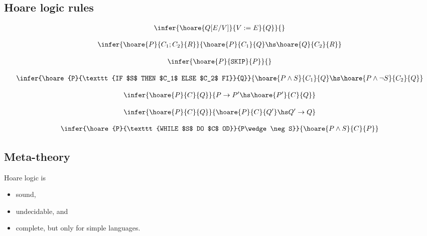 \documentclass{article}
\begin{document}
\subsection{Hoare logic rules}

\begin{definition}
	\begin{align*}
		\infer{\hoare{Q[E/V]}{V:=E}{Q}}{}
	\end{align*}
\end{definition}

\begin{definition}
	\begin{align*}
		\infer{\hoare{P}{C_1; C_2}{R}}{\hoare{P}{C_1}{Q} \hs \hoare{Q}{C_2}{R}}
	\end{align*}
\end{definition}

\begin{definition}
	\begin{align*}
		\infer{\hoare{P}{\texttt{SKIP}}{P}}{}
	\end{align*}
\end{definition}

\begin{definition}
	\begin{align*}
		\infer{\hoare{P}{\texttt{IF $S$ THEN $C_1$ ELSE $C_2$ FI}}{Q}}{
			\hoare{P\wedge S}{C_1}{Q}\hs\hoare{P\wedge\neg S}{C_2}{Q}
		}
	\end{align*}
\end{definition}

\begin{definition}
	\begin{align*}
		\infer{\hoare{P}{C}{Q}}{P\to P'\hs\hoare{P'}{C}{Q}}
	\end{align*}
\end{definition}

\begin{definition}
	\begin{align*}
		\infer{\hoare{P}{C}{Q}}{\hoare{P}{C}{Q'}\hs Q'\to Q}
	\end{align*}
\end{definition}

\begin{definition}
	\begin{align*}
		\infer{\hoare{P}{\texttt{WHILE $S$ DO $C$ OD}}{P\wedge\neg S}}{\hoare{P\wedge S}{C}{P}}
	\end{align*}
\end{definition}

\subsection{Meta-theory}

\begin{theorem}
	Hoare logic is
	\begin{itemize}
		\item sound,
		\item undecidable, and
		\item complete, but only for simple languages.
	\end{itemize}
\end{theorem}
\end{document}
